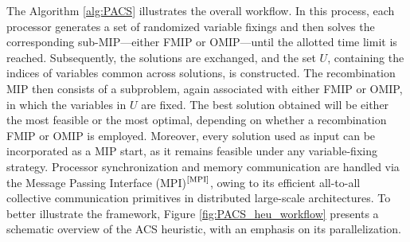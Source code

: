 The Algorithm \ref{alg:PACS} illustrates the overall workflow. In this process, each processor generates a set of randomized variable fixings and then solves the corresponding sub-MIP—either FMIP or OMIP—until the allotted time limit is reached.
Subsequently, the solutions are exchanged, and the set $U$, containing the indices of variables common across solutions, is constructed. The recombination MIP then consists of a subproblem, again associated with either FMIP or OMIP, in which the variables in $U$ are fixed.
The best solution obtained will be either the most feasible or the most optimal, depending on whether a recombination FMIP or OMIP is employed. Moreover, every solution used as input can be incorporated as a MIP start, as it remains feasible under any variable-fixing strategy.
Processor synchronization and memory communication are handled via the Message Passing Interface (MPI)$^\text{\cite{MPI}}$, owing to its efficient all-to-all collective communication primitives in distributed large-scale architectures.
To better illustrate the framework, Figure \ref{fig:PACS_heu_workflow} presents a schematic overview of the ACS heuristic, with an emphasis on its parallelization.
